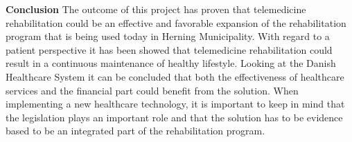\textbf{Conclusion} \newline
The outcome of this project has proven that telemedicine rehabilitation could be an effective and favorable expansion of the rehabilitation program that is being used today in Herning Municipality. With regard to a patient perspective it has been showed that telemedicine rehabilitation could result in a continuous maintenance of healthy lifestyle. Looking at the Danish Healthcare System it can be concluded that both the effectiveness of healthcare services and the financial part could benefit from the solution. When implementing a new healthcare technology, it is important to keep in mind that the legislation plays an important role and that the solution has to be evidence based to be an integrated part of the rehabilitation program.    






















